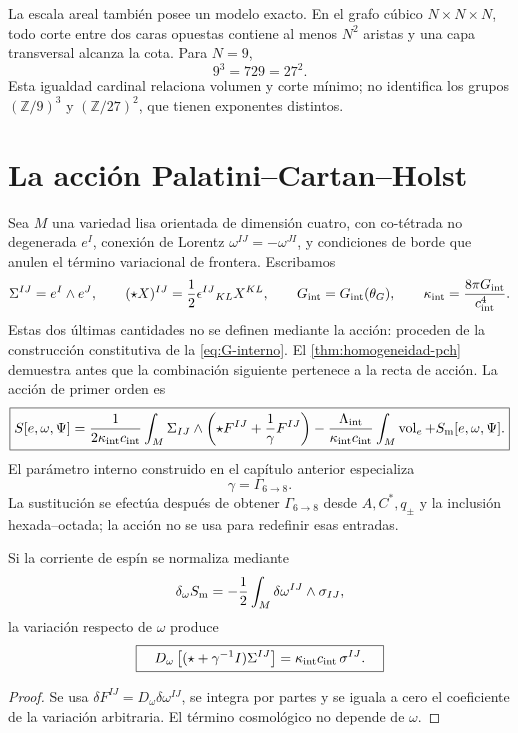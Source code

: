 La escala areal también posee un modelo exacto.  En el grafo cúbico
\(N\times N\times N\), todo corte entre dos caras opuestas contiene al menos
\(N^2\) aristas y una capa transversal alcanza la cota.  Para \(N=9\),
\[
 9^3=729=27^2.
\]
Esta igualdad cardinal relaciona volumen y corte mínimo; no identifica los
grupos \((\mathbb Z/9)^3\) y \((\mathbb Z/27)^2\), que tienen exponentes
distintos.

\section{La acción Palatini--Cartan--Holst}

Sea \(M\) una variedad lisa orientada de dimensión cuatro, con co-tétrada no
degenerada \(e^I\), conexión de Lorentz
\(\omega^{IJ}=-\omega^{JI}\), y condiciones de borde que anulen el término
variacional de frontera.  Escribamos
\[
 \Sigma^{IJ}=e^I\wedge e^J,\qquad
 (\star X)^{IJ}=\frac12\epsilon^{IJ}{}_{KL}X^{KL},
 \qquad
 G_{\rm int}=G_{\rm int}(\theta_G),\qquad
 \kappa_{\rm int}=\frac{8\pi G_{\rm int}}{c_{\rm int}^{4}}.
\]
Estas dos últimas cantidades no se definen mediante la acción: proceden de
la construcción constitutiva de la \cref{eq:G-interno}. El
\cref{thm:homogeneidad-pch} demuestra antes que la combinación siguiente
pertenece a la recta de acción.
La acción de primer orden es
\[
\boxed{
 S[e,\omega,\Psi]
 =\frac1{2\kappa_{\rm int}c_{\rm int}}\int_M
 \Sigma_{IJ}\wedge
 \left(\star F^{IJ}+\frac1\gamma F^{IJ}\right)
 -\frac{\Lambda_{\rm int}}{\kappa_{\rm int}c_{\rm int}}
  \int_M\operatorname{vol}_e
 +S_{\rm m}[e,\omega,\Psi].}
\]
El parámetro interno construido en el capítulo anterior especializa
\[
 \gamma=\Gamma_{6\to8}.
\]
La sustitución se efectúa después de obtener
\(\Gamma_{6\to8}\) desde \(A,C^\ast,q_\pm\) y la inclusión
hexada--octada; la acción no se usa para redefinir esas entradas.

\begin{theorem}
\label{thm:cartan-holst-rev6}
Si la corriente de espín se normaliza mediante
\[
 \delta_\omega S_{\rm m}
 =-\frac12\int_M\delta\omega^{IJ}\wedge\sigma_{IJ},
\]
la variación respecto de \(\omega\) produce
\[
 \boxed{\quad
 D_\omega
 \left[(\star+\gamma^{-1}I)\Sigma^{IJ}\right]
 =\kappa_{\rm int}c_{\rm int}\,\sigma^{IJ}.
 \quad}
\]
\end{theorem}

\begin{proof}
Se usa \(\delta F^{IJ}=D_\omega\delta\omega^{IJ}\), se integra por partes y
se iguala a cero el coeficiente de la variación arbitraria.  El término
cosmológico no depende de \(\omega\).
\end{proof}

